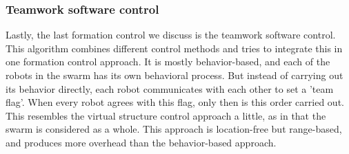 \subsubsection{Teamwork software control}
Lastly, the last formation control we discuss is the teamwork software control. \cite{kaminka2013use}
This algorithm combines different control methods and tries to integrate this in one formation control approach.
It is mostly behavior-based, and each of the robots in the swarm has its own behavioral process. 
But instead of carrying out its behavior directly, each robot communicates with each other to set a 'team flag'. 
When every robot agrees with this flag, only then is this order carried out. 
This resembles the virtual structure control approach a little, as in that the swarm is considered as a whole. 
This approach is location-free but range-based, and produces more overhead than the behavior-based approach.

  \begin{table}[H]
  \renewcommand{\arraystretch}{1.3}
  \label{table_alg_formation}
  \centering
{}
  \caption{Overview of Formation Algorithms}
  \end{table}

